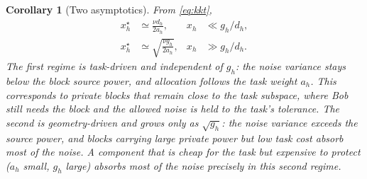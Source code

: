 \documentclass{ieeetj}
\theoremstyle{plain}
\newtheorem{corollary}{Corollary}
\theoremstyle{definition}
\begin{document}
\begin{corollary}[Two asymptotics]
\label{co:asymptotics}
From \eqref{eq:kkt},
\begin{align}
x_h^\star&\simeq\frac{\nu d_h}{2a_h}, & x_h&\ll g_h/d_h,\label{eq:asym1}\\
x_h^\star&\simeq\sqrt{\frac{\nu g_h}{2a_h}}, & x_h&\gg g_h/d_h.\label{eq:asym2}
\end{align}
The first regime is task-driven and independent of $g_h$: the noise variance
stays below the block source power, and allocation follows the task weight
$a_h$. This corresponds to private blocks that remain close to the task
subspace, where Bob still needs the block and the allowed noise is held to the
task's tolerance. The second is geometry-driven and grows only as $\sqrt{g_h}$:
the noise variance exceeds the source power, and blocks carrying large private
power but low task cost absorb most of the noise. A component that is cheap for
the task but expensive to protect ($a_h$ small, $g_h$ large) absorbs most of
the noise precisely in this second regime.
\end{corollary}
\end{document}
